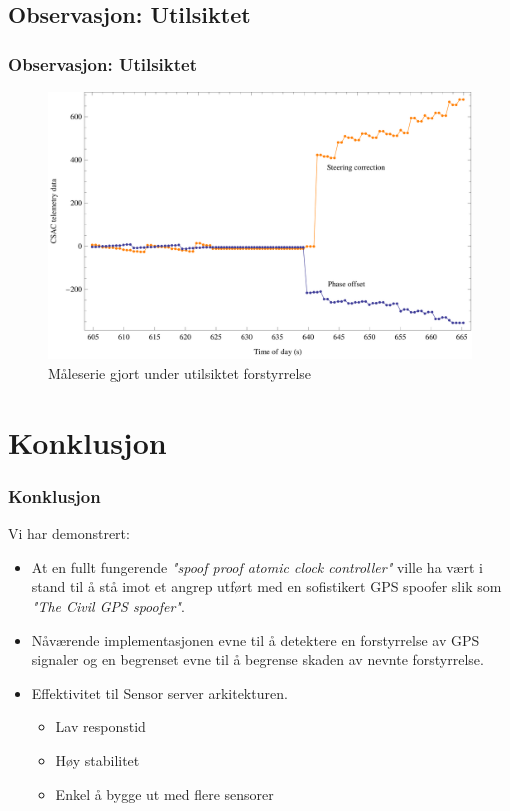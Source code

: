 \documentclass[xcolor=table]{beamer}
\begin{document}
\begin{frame}
\section{Observasjon: Utilsiktet}
\frametitle{Observasjon: Utilsiktet}
      \begin{figure}
        \includegraphics[scale=0.70]{thesis/graphics/disturbance57667-csac-telemetry-phase-steer-combined-zoom-in-2-1.png}
        \caption{Måleserie gjort under utilsiktet forstyrrelse}
      \end{figure}
\end{frame}

\section{Konklusjon}
\begin{frame}
  \frametitle{Konklusjon}
  Vi har demonstrert:
  \begin{itemize}
    \item At en fullt fungerende \textit{"spoof proof atomic clock controller"} ville ha vært i stand til å stå imot et angrep utført med en sofistikert GPS spoofer slik som \textit{"The Civil GPS spoofer"}.
    \item Nåværende implementasjonen evne til å detektere en forstyrrelse av GPS signaler og en begrenset evne til å begrense skaden av nevnte forstyrrelse.
    \item Effektivitet til Sensor server arkitekturen. 
    \begin{itemize}
      \item Lav responstid
      \item Høy stabilitet 
      \item Enkel å bygge ut med flere sensorer
    \end{itemize}
  \end{itemize}
\end{frame}
\end{document}
